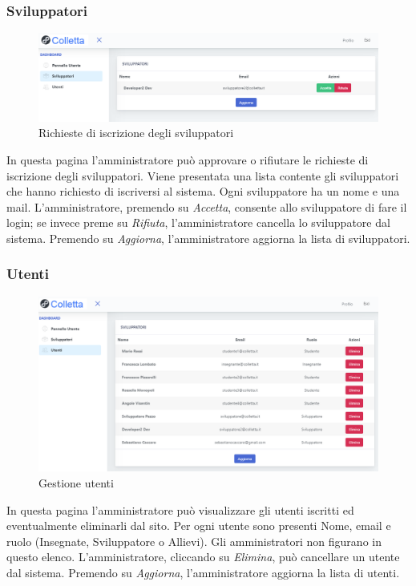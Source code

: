 		\subsubsection{Sviluppatori}
			\begin{figure}[H]
				\centering
				\includegraphics[width=17cm]{sez/img/amministratore/conf_ric_svil.PNG}
				\caption{Richieste di iscrizione degli sviluppatori}\label{fig:1}
			\end{figure}
		  In questa pagina l'amministratore può approvare o rifiutare le richieste di iscrizione degli sviluppatori. Viene presentata una lista contente gli sviluppatori che hanno richiesto di iscriversi al sistema. Ogni sviluppatore ha un nome e una mail. L'amministratore, premendo su \textit{Accetta}, consente allo sviluppatore di fare il login; se invece preme su \textit{Rifiuta}, l'amministratore cancella lo sviluppatore dal sistema. Premendo su \textit{Aggiorna}, l'amministratore aggiorna la lista di sviluppatori.


		\subsubsection{Utenti}
			\begin{figure}[H]
				\centering
				\includegraphics[width=17cm]{sez/img/amministratore/gestisciutenti.PNG}
				\caption{Gestione utenti}\label{fig:1}
			\end{figure}
		  In questa pagina l'amministratore può visualizzare gli utenti iscritti ed eventualmente eliminarli dal sito. Per ogni utente sono presenti Nome, email e ruolo (Insegnate, Sviluppatore o Allievi). Gli amministratori non figurano in questo elenco. L'amministratore, cliccando su \textit{Elimina}, può cancellare un utente dal sistema. Premendo su \textit{Aggiorna}, l'amministratore aggiorna la lista di utenti.
